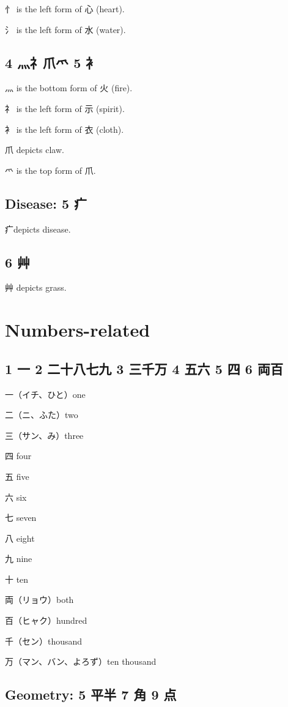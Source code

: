 忄 is the left form of 心 (heart).

氵 is the left form of 水 (water).

\subsection{4 灬礻爪爫 5 衤}

灬 is the bottom form of 火 (fire).

礻 is the left form of 示 (spirit).

衤 is the left form of 衣 (cloth).

爪 depicts claw.

爫 is the top form of 爪.

\subsection{Disease: 5 疒}

疒depicts disease.

\subsection{6 艸}

艸 depicts grass.

\section{Numbers-related}

\subsection{1 一 2 二十八七九 3 三千万 4 五六 5 四 6 両百}

一（イチ、ひと）one

二（ニ、ふた）two

三（サン、み）three

四 four

五 five

六 six

七 seven

八 eight

九 nine

十 ten

両（リョウ）both

百（ヒャク）hundred

千（セン）thousand

万（マン、バン、よろず）ten thousand

\subsection{Geometry: 5 平半 7 角 9 点}

